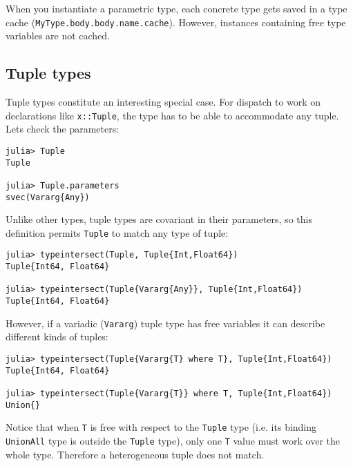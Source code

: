 When you instantiate a parametric type, each concrete type gets saved in a type cache (\texttt{MyType.body.body.name.cache}). However, instances containing free type variables are not cached.



\hypertarget{15137612054834825471}{}


\subsection{Tuple types}



Tuple types constitute an interesting special case.  For dispatch to work on declarations like \texttt{x::Tuple}, the type has to be able to accommodate any tuple.  Let{\textquotesingle}s check the parameters:




\begin{verbatim}
julia> Tuple
Tuple

julia> Tuple.parameters
svec(Vararg{Any})
\end{verbatim}



Unlike other types, tuple types are covariant in their parameters, so this definition permits \texttt{Tuple} to match any type of tuple:




\begin{verbatim}
julia> typeintersect(Tuple, Tuple{Int,Float64})
Tuple{Int64, Float64}

julia> typeintersect(Tuple{Vararg{Any}}, Tuple{Int,Float64})
Tuple{Int64, Float64}
\end{verbatim}



However, if a variadic (\texttt{Vararg}) tuple type has free variables it can describe different kinds of tuples:




\begin{verbatim}
julia> typeintersect(Tuple{Vararg{T} where T}, Tuple{Int,Float64})
Tuple{Int64, Float64}

julia> typeintersect(Tuple{Vararg{T}} where T, Tuple{Int,Float64})
Union{}
\end{verbatim}



Notice that when \texttt{T} is free with respect to the \texttt{Tuple} type (i.e. its binding \texttt{UnionAll} type is outside the \texttt{Tuple} type), only one \texttt{T} value must work over the whole type. Therefore a heterogeneous tuple does not match.



